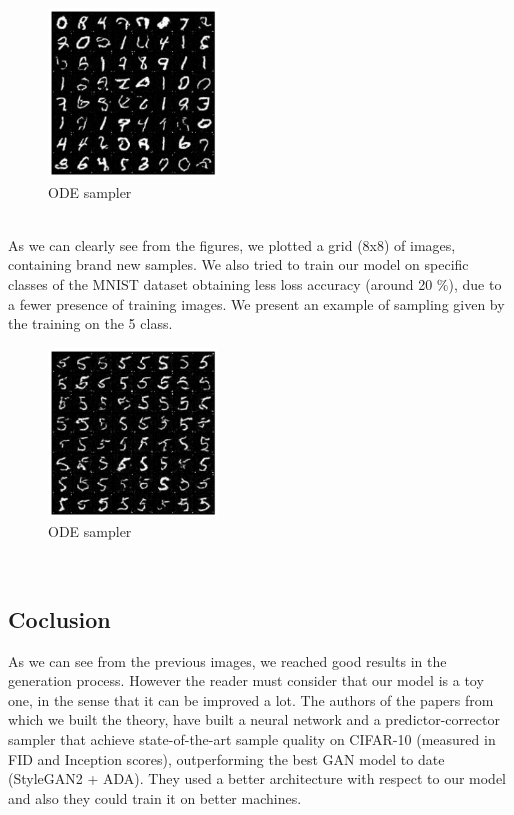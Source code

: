 \documentclass{article}
\begin{document}
\newline
\begin{figure}[htbp]
    \centering
    \includegraphics[width=0.4\textwidth]{ODE} 
    \caption{ODE sampler}
\end{figure}\\
\newline
As we can clearly see from the figures, we plotted a grid (8x8) of images, containing brand new samples. We also tried to train our model on specific classes of the MNIST dataset obtaining less loss accuracy (around 20 $\%$), due to a fewer presence of training images. We present an example of sampling given by the training on the 5 class.\\
\newline
\begin{figure}[htbp]
    \centering
    \includegraphics[width=0.4\textwidth]{5ODE} 
    \caption{ODE sampler}
\end{figure}\\
\newline
\subsection{Coclusion}
As we can see from the previous images, we reached good results in the generation process. However the reader must consider that our model is a toy one, in the sense that it can be improved a lot. The authors of the papers from which we built the theory, have built a neural network and a predictor-corrector sampler that achieve state-of-the-art sample quality on CIFAR-10 (measured in FID and Inception scores), outperforming the best GAN model to date (StyleGAN2 + ADA). They used a better architecture with respect to our model and also they could train it on better machines.
\end{document}
